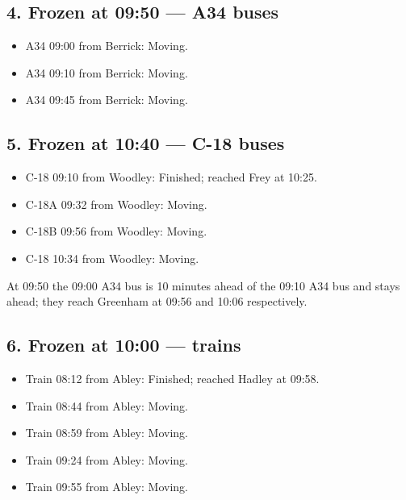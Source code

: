 \documentclass[11pt,a4paper]{article}
\begin{document}
\subsection*{4. Frozen at 09:50 --- A34 buses}
\begin{itemize}[leftmargin=*]
\item A34 09:00 from Berrick: Moving.
\item A34 09:10 from Berrick: Moving.
\item A34 09:45 from Berrick: Moving.
\end{itemize}

\subsection*{5. Frozen at 10:40 --- C-18 buses}
\begin{itemize}[leftmargin=*]
\item C-18 09:10 from Woodley: Finished; reached Frey at 10:25.
\item C-18A 09:32 from Woodley: Moving.
\item C-18B 09:56 from Woodley: Moving.
\item C-18 10:34 from Woodley: Moving.
\end{itemize}
At 09:50 the 09:00 A34 bus is 10 minutes ahead of the 09:10 A34 bus and stays ahead; they reach Greenham at 09:56 and 10:06 respectively.

\subsection*{6. Frozen at 10:00 --- trains}
\begin{itemize}[leftmargin=*]
\item Train 08:12 from Abley: Finished; reached Hadley at 09:58.
\item Train 08:44 from Abley: Moving.
\item Train 08:59 from Abley: Moving.
\item Train 09:24 from Abley: Moving.
\item Train 09:55 from Abley: Moving.
\end{itemize}
\end{document}

